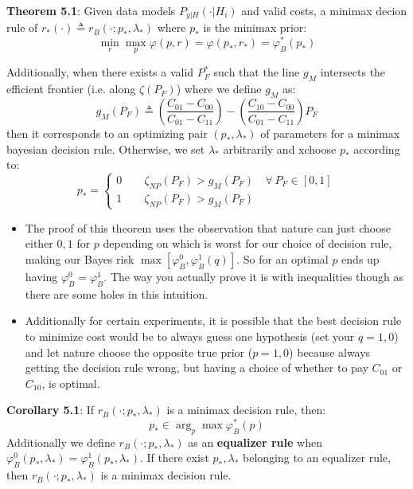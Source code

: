 \documentclass[12pt]{article} %
\begin{document}
\textbf{Theorem 5.1}: Given data models $P_{y|H}(\cdot|H_i)$ and valid costs, a minimax decion rule of $r_*(\cdot) \triangleq r_B(\cdot;p_*,\lambda_*)$ where $p_*$ is the minimax prior:
\begin{equation*}
    \min_r \max_p \varphi(p,r) = \varphi(p_*,r_*) = \varphi_B^*(p_*)
\end{equation*}

Additionally, when there exists a valid $P_F^*$ such that the line $g_M$ intersects the efficient frontier (i.e. along $\zeta(P_F)$) where we define $g_M$ as:
\begin{equation*}
    g_M(P_F) \triangleq 
    \left(
    \frac{C_{01}-C_{00}}{C_{01}-C_{11}}
    \right) -
    \left(
    \frac{C_{10}-C_{00}}{C_{01}-C_{11}}
    \right)
    P_F
\end{equation*}
then it corresponds to an optimizing pair $(p_*,\lambda_*)$ of parameters for a minimax bayesian decision rule. Otherwise, we set $\lambda_*$ arbitrarily and xchoose $p_*$ according to:
\begin{equation*}
    p_* = 
    \begin{cases}
        0 \qquad \zeta_{NP}(P_F) > g_M(P_F) \quad \forall \ P_F \in [0,1] \\
        1 \qquad \zeta_{NP}(P_F) > g_M(P_F) 
    \end{cases}
\end{equation*}
\begin{itemize}[topsep=0pt]
    \item 
The proof of this theorem uses the observation that nature can just choose either $0,1$ for $p$ depending on which is worst for our choice of decision rule, making our Bayes risk $\max [\varphi_B^0, \varphi_B^1(q)]$. So for an optimal $p$ ends up having $\varphi_B^0 = \varphi_B^1$. The way you actually prove it is with inequalities though as there are some holes in this intuition.

    \item
Additionally for certain experiments, it is possible that the best decision rule to minimize cost would be to always guess one hypothesis (set your $q=1,0$) and let nature choose the opposite true prior ($p = 1,0$) because always getting the decision rule wrong, but having a choice of whether to pay $C_{01}$ or $C_{10}$, is optimal.

\end{itemize}




\textbf{Corollary 5.1}: If $r_B(\cdot; p_*,\lambda_*)$ is a minimax decision rule, then:
\begin{equation*}
    p_* \in \arg_p \max \varphi_B^*(p)
\end{equation*}
Additionally we define $r_B(\cdot;p_*,\lambda_*)$ as an \textbf{equalizer rule} when $\varphi_B^0(p_*,\lambda_*) = \varphi_B^1(p_*,\lambda_*)$. If there exist $p_*,\lambda_*$ belonging to an equalizer rule, then $r_B(\cdot;p_*,\lambda_*)$ is a minimax decision rule.
\end{document}
